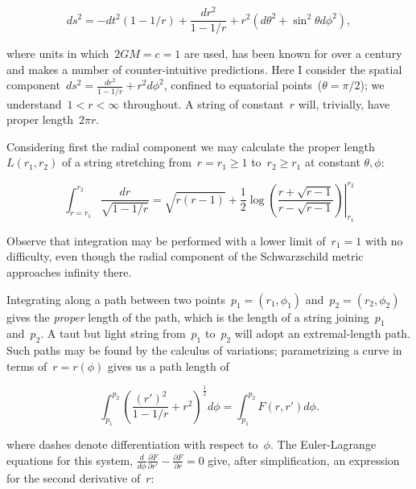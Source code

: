 \documentclass[times,twocolumn,final]{elsarticle}
\begin{document}
\begin{equation}\label{schwarzschild}
ds^2= -dt^2\left(1-1/r\right) +\frac{dr^2}{1-1/r} + r^2\left(d\theta^2 + \sin^2\theta d\phi^2\right),
\end{equation}

\noindent where units in which~$2GM=c=1$ are used, has been known for
over a century~\cite{schwarzschild1916} and makes a number of
counter-intuitive predictions.  Here I consider the spatial
component~$ds^2= \frac{dr^2}{1-1/r} + r^2d\phi^2$, confined to
equatorial points~($\theta=\pi/2$); we understand~$1<r<\infty$
throughout.  A string of constant~$r$ will, trivially, have proper
length~$2\pi r$.

Considering first the radial component we may calculate the
proper length $L\left(r_1,r_2\right)$ of a string stretching
from~$r=r_1\geq 1$ to~$r_2\geq r_1$ at constant $\theta,\phi$:

\begin{equation}\label{radial_string_length}
  \int_{r=r_1}^{r_2}\frac{dr}{\sqrt{1-1/r}}=
  \left.
  \sqrt{r(r-1)} +\frac{1}{2}\log\left(
  \frac{r+\sqrt{r-1}}{r-\sqrt{r-1}}\right)
  \right|_{r_1}^{r_2}
  \end{equation}

Observe that integration may be performed with a lower limit
of~$r_1=1$ with no difficulty, even though the radial component of the
Schwarzschild metric approaches infinity there.  

Integrating along a path between two
points~$p_1=\left(r_1,\phi_1\right)$ and~$p_2=\left(r_2,\phi_2\right)$
gives the {\em proper} length of the path, which is the length of a
string joining~$p_1$ and~$p_2$.  A taut but light string from~$p_1$
to~$p_2$ will adopt an extremal-length path.  Such paths may be found
by the calculus of variations; parametrizing a curve in terms
of~$r=r\left(\phi\right)$ gives us a path length of

\begin{equation}
  \int_{p_1}^{p_2}\left(\frac{\left(r'\right)^2}{1-1/r} + r^2\right)^\frac{1}{2}d\phi=
  \int_{p_1}^{p_2}F\left(r,r'\right)d\phi.
\end{equation}

\noindent where dashes denote differentiation with respect to~$\phi$.  The
Euler-Lagrange equations for this system,
$\frac{d}{d\phi}\frac{\partial F}{\partial r'}-\frac{\partial
  F}{\partial r}=0$ give, after simplification, an expression for the
second derivative of~$r$:
\end{document}
